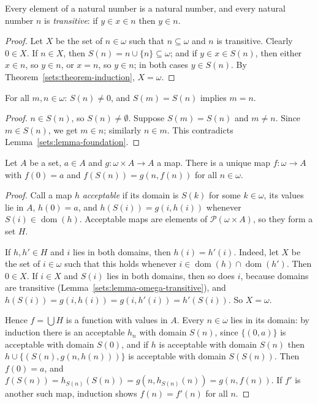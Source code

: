 \begin{lemma}\label{sets:lemma-omega-transitive}
Every element of a natural number is a natural number, and every natural
number $n$ is \emph{transitive}: if $y \in x \in n$ then $y \in n$.
\end{lemma}

\begin{proof}
Let $X$ be the set of $n \in \omega$ such that $n \subseteq \omega$ and $n$ is
transitive. Clearly $0 \in X$. If $n \in X$, then
$S(n) = n \cup \{n\} \subseteq \omega$; and if $y \in x \in S(n)$, then either
$x \in n$, so $y \in n$, or $x = n$, so $y \in n$; in both cases $y \in S(n)$.
By Theorem~\ref{sets:theorem-induction}, $X = \omega$.
\end{proof}

\begin{proposition}\label{sets:proposition-peano}
For all $m, n \in \omega$: $S(n) \neq 0$, and $S(m) = S(n)$ implies $m = n$.
\end{proposition}

\begin{proof}
$n \in S(n)$, so $S(n) \neq \emptyset$. Suppose $S(m) = S(n)$ and $m \neq n$.
Since $m \in S(n)$, we get $m \in n$; similarly $n \in m$. This contradicts
Lemma~\ref{sets:lemma-foundation}.
\end{proof}

\begin{theorem}[Recursion]\label{sets:theorem-recursion}
Let $A$ be a set, $a \in A$ and $g \colon \omega \times A \to A$ a map. There is a
unique map $f \colon \omega \to A$ with $f(0) = a$ and $f(S(n)) = g(n, f(n))$ for
all $n \in \omega$.
\end{theorem}

\begin{proof}
Call a map $h$ \emph{acceptable} if its domain is $S(k)$ for some $k \in \omega$,
its values lie in $A$, $h(0) = a$, and $h(S(i)) = g(i, h(i))$ whenever
$S(i) \in \operatorname{dom}(h)$. Acceptable maps are elements of
$\mathcal{P}(\omega \times A)$, so they form a set $H$.

If $h, h' \in H$ and $i$ lies in both domains, then $h(i) = h'(i)$. Indeed,
let $X$ be the set of $i \in \omega$ such that this holds whenever
$i \in \operatorname{dom}(h) \cap \operatorname{dom}(h')$. Then $0 \in X$. If
$i \in X$ and $S(i)$ lies in both domains, then so does $i$, because domains
are transitive (Lemma~\ref{sets:lemma-omega-transitive}), and
$h(S(i)) = g(i, h(i)) = g(i, h'(i)) = h'(S(i))$. So $X = \omega$.

Hence $f = \bigcup H$ is a function with values in $A$. Every $n \in \omega$ lies
in its domain: by induction there is an acceptable $h_n$ with domain $S(n)$,
since $\{(0, a)\}$ is acceptable with domain $S(0)$, and if $h$ is acceptable
with domain $S(n)$ then $h \cup \{(S(n), g(n, h(n)))\}$ is acceptable with domain
$S(S(n))$. Then $f(0) = a$, and $f(S(n)) = h_{S(n)}(S(n)) = g(n, h_{S(n)}(n)) = g(n, f(n))$.
If $f'$ is another such map, induction shows $f(n) = f'(n)$ for all $n$.
\end{proof}

